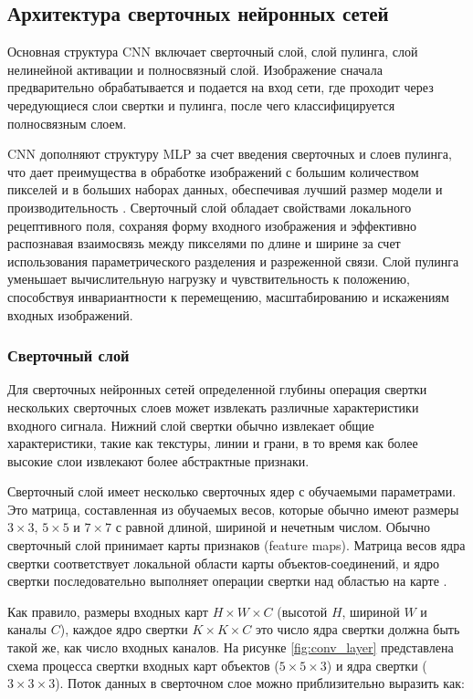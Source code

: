 \subsection{Архитектура сверточных нейронных сетей}

Основная структура CNN включает сверточный слой, слой пулинга, слой нелинейной активации и полносвязный слой. Изображение сначала предварительно обрабатывается и подается на вход сети, где проходит через чередующиеся слои свертки и пулинга, после чего классифицируется полносвязным слоем. 

CNN дополняют структуру MLP за счет введения сверточных и слоев пулинга, что дает преимущества в обработке изображений с большим количеством пикселей и в больших наборах данных, обеспечивая лучший размер модели и производительность \cite{cnn-mlp}. Сверточный слой обладает свойствами локального рецептивного поля, сохраняя форму входного изображения и эффективно распознавая взаимосвязь между пикселями по длине и ширине за счет использования параметрического разделения и разреженной связи. Слой пулинга уменьшает вычислительную нагрузку и чувствительность к положению, способствуя инвариантности к перемещению, масштабированию и искажениям входных изображений.

\subsubsection{Сверточный слой}

Для сверточных нейронных сетей определенной глубины операция свертки нескольких сверточных слоев может извлекать различные характеристики входного сигнала. Нижний слой свертки обычно извлекает общие характеристики, такие как текстуры, линии и грани, в то время как более высокие слои извлекают более абстрактные признаки.

Сверточный слой имеет несколько сверточных ядер с обучаемыми параметрами. Это матрица, составленная из обучаемых весов, которые обычно имеют размеры $3 \times 3$, $5 \times 5$ и $7 \times 7$ с равной длиной, шириной и нечетным числом. Обычно сверточный слой  принимает карты признаков (feature maps). Матрица весов ядра свертки соответствует локальной области карты объектов-соединений, и ядро свертки последовательно выполняет операции свертки над областью на карте \cite{conv-layer}.

Как правило, размеры входных карт $H \times W \times C$
(высотой $H$, шириной $W$ и каналы $C$), каждое ядро свертки $K \times K \times C$
это число ядра свертки должна быть такой же, как число входных каналов. На рисунке \ref{fig:conv_layer} представлена  схема процесса свертки входных карт объектов ($5 \times 5 \times 3$) и ядра свертки ($3 \times 3 \times 3$). Поток данных в сверточном слое можно приблизительно выразить как:

